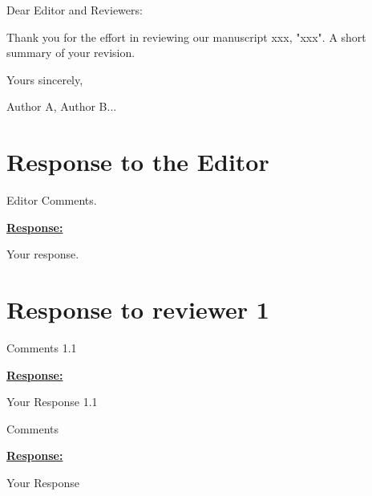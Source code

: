 

\noindent
Dear Editor and Reviewers:

\vspace{0.2cm}
\noindent
Thank you for the effort in reviewing our manuscript xxx, "xxx". 
A short summary of your revision.

\vspace{0.2cm}
\noindent
Yours sincerely,

\noindent
Author A, Author B...



\section*{Response to the Editor} 
\begin{cmt*}{}{}
Editor Comments.
\end{cmt*}

\vspace{0.1cm}
\noindent
\underline{\textbf{Response:}}
\vspace{0.2cm}

Your response. 




\newpage
\section{Response to reviewer 1} 

\begin{cmt}{}{}

Comments 1.1

\end{cmt}
\vspace{0.1cm}
\noindent
\underline{\textbf{Response:}}
\vspace{0.2cm}

Your Response 1.1

\vspace{0.3cm}


\begin{cmt*}{}{}        %

Comments

\end{cmt*}
\vspace{0.1cm}
\noindent
\underline{\textbf{Response:}}
\vspace{0.2cm}

Your Response 

